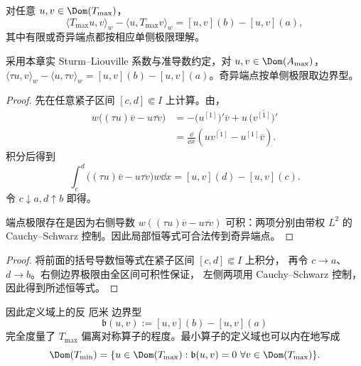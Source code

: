\begin{lemma}\label{lem:math-sl-lagrange}
对任意 $u,v\in\Dom(T_{\max})$，
\begin{equation}\label{eq:math-sl-lagrange}
 \langle T_{\max}u,v\rangle_w-\langle u,T_{\max}v\rangle_w
 =[u,v](b)-[u,v](a),
\end{equation}
其中有限或奇异端点都按相应单侧极限理解。
\end{lemma}

\begin{lemma}
采用本章实 Sturm--Liouville 系数与准导数约定，对 $u,v\in\Dom(A_{\max})$，$\langle\tau u,v\rangle_w-\langle u,\tau v\rangle_w=[u,v](b)-[u,v](a)$。奇异端点按单侧极限取边界型。
\end{lemma}
\begin{proof}
先在任意紧子区间 $[c,d]\Subset I$ 上计算。由，
\[
\begin{aligned}
 w\bigl((\tau u)\overline v-u\overline{\tau v}\bigr)
 &=-\bigl(u^{[1]}\bigr)'\overline v
   +u\,\overline{\bigl(v^{[1]}\bigr)'}\\
 &=\frac{\dd}{\dd x}
   \left(u\overline{v^{[1]}}-u^{[1]}\overline v\right).
\end{aligned}
\]
积分后得到
\[
 \int_c^d \bigl((\tau u)\overline v-u\overline{\tau v}\bigr)w\dd x
 =[u,v](d)-[u,v](c).
\]
令 $c\downarrow a,d\uparrow b$ 即得。

端点极限存在是因为右侧导数 $w((\tau u)\overline v-u\overline{\tau v})$ 可积：两项分别由带权 $L^2$ 的 Cauchy--Schwarz 控制。因此局部恒等式可合法传到奇异端点。
\end{proof}

\begin{proof}
将前面的括号导数恒等式在紧子区间 $[c,d]\Subset I$ 上积分，
再令 $c\to a$、$d\to b$。右侧边界极限由全区间可积性保证，
左侧两项用 Cauchy--Schwarz 控制，因此得到所述恒等式。
\end{proof}


\begin{proposition}[最小域与边界型的消失]
因此定义域上的反 厄米 边界型
\[
 \mathfrak b(u,v):=[u,v](b)-[u,v](a)
\]
完全度量了 $T_{\max}$ 偏离对称算子的程度。最小算子的定义域也可以内在地写成
\[
 \Dom(T_{\min})
 =\{u\in\Dom(T_{\max}):\mathfrak b(u,v)=0\ \forall v\in\Dom(T_{\max})\}.
\]
\end{proposition}

